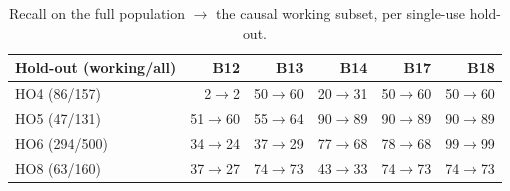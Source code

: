 \begin{table}[t]\centering\caption{Recall on the full population $\rightarrow$ the causal working subset, per single-use hold-out.}\label{tab:twoden}
\footnotesize\begin{tabular}{lrrrrr}\toprule Hold-out (working/all) & B12 & B13 & B14 & B17 & B18\\\midrule
HO4 (86/157) & 2$\rightarrow$2 & 50$\rightarrow$60 & 20$\rightarrow$31 & 50$\rightarrow$60 & 50$\rightarrow$60\\
HO5 (47/131) & 51$\rightarrow$60 & 55$\rightarrow$64 & 90$\rightarrow$89 & 90$\rightarrow$89 & 90$\rightarrow$89\\
HO6 (294/500) & 34$\rightarrow$24 & 37$\rightarrow$29 & 77$\rightarrow$68 & 78$\rightarrow$68 & 99$\rightarrow$99\\
HO8 (63/160) & 37$\rightarrow$27 & 74$\rightarrow$73 & 43$\rightarrow$33 & 74$\rightarrow$73 & 74$\rightarrow$73\\
\bottomrule\end{tabular}\end{table}
